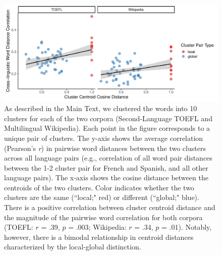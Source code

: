 \documentclass[9pt,twoside,lineno]{pnas-new}
\begin{document}
\pagebreak

\clearpage


\begin{figure}[h]
\centering
\includegraphics[width = 6.3in]{suppfigs/continuous_semantic_clusters.pdf}
   \caption{As described in the Main Text, we clustered the words  into 10 clusters for each of the two corpora (Second-Language TOEFL and Multilingual Wikipedia). Each point in the figure corresponds to a unique pair of clusters. The y-axis shows the average correlation (Pearson's {\it r}) in pairwise word distances between the two clusters across all language pairs (e.g., correlation of all word pair distances between the 1-2 cluster pair for French and Spanish, and all other language pairs). The x-axis shows the cosine distance between the centroids of the two clusters. Color indicates whether the two clusters are the same  (``local;" red) or different (``global;" blue). There is a positive correlation between cluster centroid distance and the magnitude of the pairwise word correlation for both corpora (TOEFL: $r$ = .39, $p$ = .003; Wikipedia: $r$ = .34, $p$ = .01). Notably, however, there is a bimodal relationship in centroid distances characterized by the local-global distinction.}
\end{figure}


\pagebreak
\clearpage





\end{document}
